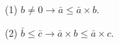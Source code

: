 (1) $b \neq 0 \rightarrow \bar{a} \leq \bar{a} \times b$.

(2) $\bar{b} \leq \bar{c} \rightarrow \bar{a} \times b \leq \bar{a} \times c$.
